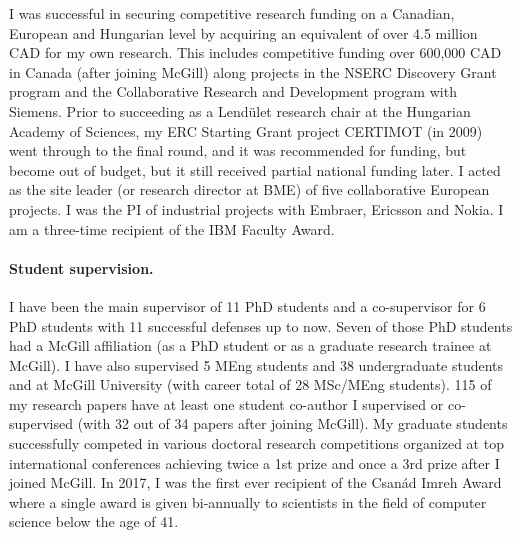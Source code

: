 I was successful in securing competitive research funding on a Canadian, European and Hungarian level by acquiring an equivalent of over 4.5 million CAD for my own research. This includes competitive funding over 600,000 CAD in Canada (after joining McGill) along projects in the NSERC Discovery Grant program and the Collaborative Research and Development program with Siemens. Prior to succeeding as a Lendület research chair at the Hungarian Academy of Sciences, my ERC Starting Grant project CERTIMOT (in 2009) went through to the final round, and it was recommended for funding, but become out of budget, but it still received partial national funding later. I acted as the site leader (or research director at BME) of five collaborative European projects.%
I was the PI of industrial projects with Embraer, Ericsson and Nokia. I am a three-time recipient of the IBM Faculty Award.

\paragraph{Student supervision.}
I have been the main supervisor of 11 PhD students and a co-supervisor for 6 PhD students with 11 successful defenses up to now. Seven of those PhD students had a McGill affiliation (as a PhD student or as a graduate research trainee at McGill). I have also supervised 5 MEng students and 38 undergraduate students and at McGill University (with career total of 28 MSc/MEng students). 115 of my research papers have at least one student co-author I supervised or co-supervised (with 32 out of 34 papers after joining McGill). My graduate students successfully competed in various doctoral research competitions organized at top international conferences achieving twice a 1st prize and once a 3rd prize after I joined McGill. 
In 2017, I was the first ever recipient of the Csanád Imreh Award where a single award is given bi-annually to scientists in the field of computer science below the age of 41. 

